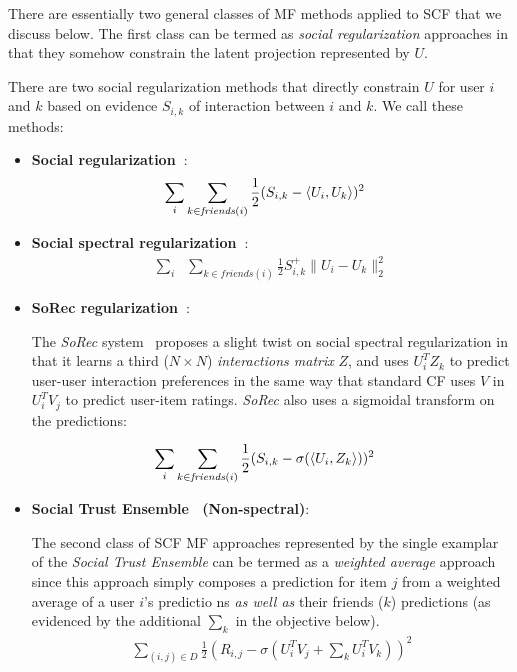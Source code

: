 There are essentially two general classes of MF methods applied to SCF that we discuss
below.  The first class can be termed as \emph{social regularization}
approaches in that they somehow constrain the latent projection
represented by $U$.  

There are two social regularization methods that directly constrain $U$ for user $i$
and $k$ based on evidence $S_{i,k}$ of interaction between $i$ and $k$.  We call
these methods:

\begin{itemize}
\item {\bf Social regularization~\cite{lla,socinf}}:
\begin{align}
\sum_{i} & \sum_{k \in \mathit{friends}(i)} \frac{1}{2} (S_{i,k} - \langle U_i, U_k \rangle)^2 \nonumber 
\end{align}

\item {\bf Social spectral regularization~\cite{sr,rrmf}}:
\begin{align}
\sum_{i} & \sum_{k \in \mathit{friends}(i)} \frac{1}{2} S^+_{i,k} \| U_i - U_k \|_2^2 \nonumber
\end{align}
\end{itemize}

\begin{itemize}
\item {\bf SoRec regularization~\cite{sorec}}:

The {\it SoRec} system~\cite{sorec} proposes a slight twist on social
spectral regularization in that it learns a third ($N \times N$)
\emph{interactions matrix} $Z$, and uses $U_i^T Z_k$ to predict user-user
interaction preferences in the same way that standard CF uses $V$ in
$U_i^T V_j$ to predict user-item ratings.  {\it SoRec} also uses a
sigmoidal transform on the predictions:

\begin{align}
\sum_{i} & \sum_{k \in \mathit{friends}(i)} \frac{1}{2} (S_{i,k} - \sigma(\langle U_i, Z_k \rangle))^2 \nonumber
\end{align}
\end{itemize}

\begin{itemize}
\item {\bf Social Trust Ensemble~\cite{ste} (Non-spectral)}:

The second class of SCF MF approaches represented by the single
examplar of the {\it Social Trust Ensemble} can be termed as a
\emph{weighted average} approach since this approach simply composes a
prediction for item $j$ from a weighted average of a user $i$'s
predictio
ns \emph{as well as} their friends ($k$) predictions (as
evidenced by the additional $\sum_k$ in the objective below).
\begin{align}
\sum_{(i,j) \in D} \frac{1}{2} (R_{i,j} - \sigma (U_i^T V_j + \sum_k U_i^T V_k))^2 \nonumber
\end{align}
\end{itemize}

